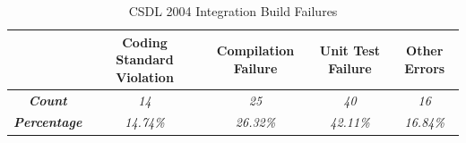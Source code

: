 \begin{table}[tbp]
	\centering   
		\begin{tabular}{|c|c|c|c|c|} 
			\hline
			\textbf{} & \textbf{Coding Standard Violation} & \textbf{Compilation Failure} & \textbf{Unit Test Failure} & \textbf{Other Errors} \\
			\hline
			\textit{\textbf{Count}} & \textit{14} & \textit{25} & \textit{40} & \textit{16} \\
			\hline
		  \textit{\textbf{Percentage}} & \textit{14.74\%} & \textit{26.32\%} & \textit{42.11\%} & \textit{16.84\%} \\
			\hline
		\end{tabular}
  \caption{CSDL 2004 Integration Build Failures}
	\label{table:CSDL-BuildFailureCategory-2004}
\end{table}

